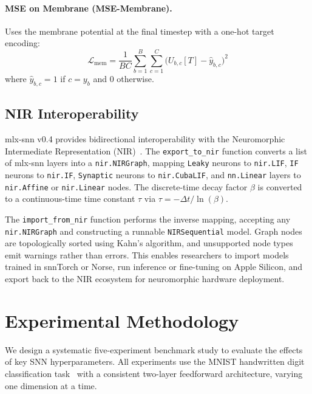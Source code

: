 \documentclass[11pt]{article}
\begin{document}
\paragraph{MSE on Membrane (MSE-Membrane).}
Uses the membrane potential at the final timestep with a one-hot target encoding:
\begin{equation}
    \mathcal{L}_{\text{mem}} = \frac{1}{BC}\sum_{b=1}^{B}\sum_{c=1}^{C} \big(U_{b,c}[T] - \hat{y}_{b,c}\big)^2
    \label{eq:mse_mem}
\end{equation}
where $\hat{y}_{b,c} = 1$ if $c = y_b$ and $0$ otherwise.

\subsection{NIR Interoperability}
\label{sec:nir}

mlx-snn v0.4 provides bidirectional interoperability with the Neuromorphic Intermediate Representation (NIR)~\citep{pedersen2024nir}. The \texttt{export\_to\_nir} function converts a list of mlx-snn layers into a \texttt{nir.NIRGraph}, mapping \texttt{Leaky} neurons to \texttt{nir.LIF}, \texttt{IF} neurons to \texttt{nir.IF}, \texttt{Synaptic} neurons to \texttt{nir.CubaLIF}, and \texttt{nn.Linear} layers to \texttt{nir.Affine} or \texttt{nir.Linear} nodes. The discrete-time decay factor $\beta$ is converted to a continuous-time time constant $\tau$ via $\tau = -\Delta t / \ln(\beta)$.

The \texttt{import\_from\_nir} function performs the inverse mapping, accepting any \texttt{nir.NIRGraph} and constructing a runnable \texttt{NIRSequential} model. Graph nodes are topologically sorted using Kahn's algorithm, and unsupported node types emit warnings rather than errors. This enables researchers to import models trained in snnTorch or Norse, run inference or fine-tuning on Apple Silicon, and export back to the NIR ecosystem for neuromorphic hardware deployment.

\section{Experimental Methodology}
\label{sec:methodology}

We design a systematic five-experiment benchmark study to evaluate the effects of key SNN hyperparameters. All experiments use the MNIST handwritten digit classification task~\citep{lecun1998gradient} with a consistent two-layer feedforward architecture, varying one dimension at a time.
\end{document}
